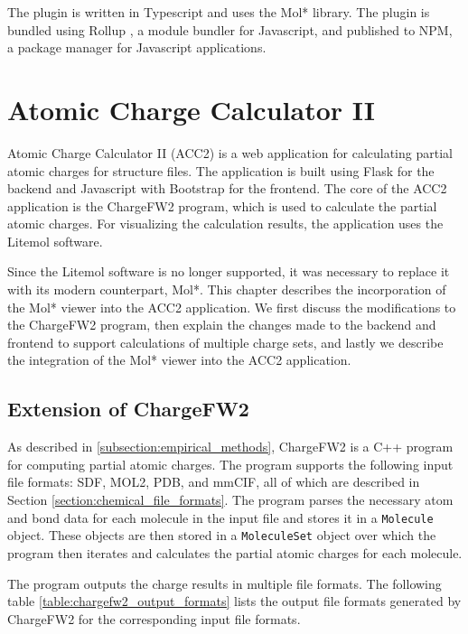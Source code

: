 \documentclass[
  digital,     %
  oneside,     %
  nosansbold,  %
  nocolorbold, %
  lof,         %
  lot,         %
]{fithesis4}
\begin{document}
The plugin is written in Typescript and uses the Mol* library. The plugin is bundled using Rollup \cite{rollup}, a module bundler for Javascript, and published to NPM, a package manager for Javascript applications. \cite{npm}

\chapter{Atomic Charge Calculator II}
\label{chapter:atomic_charge_calculator_ii}

Atomic Charge Calculator II (ACC2) is a web application for calculating partial atomic charges for structure files. The application is built using Flask for the backend and Javascript with Bootstrap for the frontend. The core of the ACC2 application is the ChargeFW2 program, which is used to calculate the partial atomic charges. For visualizing the calculation results, the application uses the Litemol software. \cite{racek2020acc2} 

Since the Litemol software is no longer supported, it was necessary to replace it with its modern counterpart, Mol*. This chapter describes the incorporation of the Mol* viewer into the ACC2 application. We first discuss the modifications to the ChargeFW2 program, then explain the changes made to the backend and frontend to support calculations of multiple charge sets, and lastly we describe the integration of the Mol* viewer into the ACC2 application.

\section{Extension of ChargeFW2}
\label{section:chargefw2_extension}

As described in \ref{subsection:empirical_methods}, ChargeFW2 is a C++ program for computing partial atomic charges. The program supports the following input file formats: SDF, MOL2, PDB, and mmCIF, all of which are described in Section \ref{section:chemical_file_formats}. The program parses the necessary atom and bond data for each molecule in the input file and stores it in a \texttt{Molecule} object. These objects are then stored in a \texttt{MoleculeSet} object over which the program then iterates and calculates the partial atomic charges for each molecule.

The program outputs the charge results in multiple file formats. The following table \ref{table:chargefw2_output_formats} lists the output file formats generated by ChargeFW2 for the corresponding input file formats.
\end{document}
